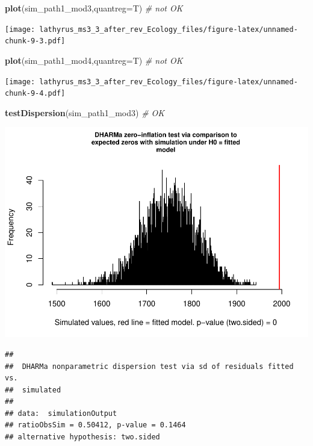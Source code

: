 \documentclass[
]{article}
\newenvironment{Shaded}{\begin{snugshade}}{\end{snugshade}}
\newcommand{\CommentTok}[1]{\textcolor[rgb]{0.56,0.35,0.01}{\textit{#1}}}
\newcommand{\DataTypeTok}[1]{\textcolor[rgb]{0.13,0.29,0.53}{#1}}
\newcommand{\KeywordTok}[1]{\textcolor[rgb]{0.13,0.29,0.53}{\textbf{#1}}}
\newcommand{\NormalTok}[1]{#1}
\begin{document}
\begin{Shaded}
\begin{Highlighting}[]
\KeywordTok{plot}\NormalTok{(sim\_path1\_mod3,}\DataTypeTok{quantreg=}\NormalTok{T) }\CommentTok{\# not OK }
\end{Highlighting}
\end{Shaded}

\texttt{[image: lathyrus\_ms3\_3\_after\_rev\_Ecology\_files/figure-latex/unnamed-chunk-9-3.pdf]}

\begin{Shaded}
\begin{Highlighting}[]
\KeywordTok{plot}\NormalTok{(sim\_path1\_mod4,}\DataTypeTok{quantreg=}\NormalTok{T) }\CommentTok{\# not OK}
\end{Highlighting}
\end{Shaded}

\texttt{[image: lathyrus\_ms3\_3\_after\_rev\_Ecology\_files/figure-latex/unnamed-chunk-9-4.pdf]}

\begin{Shaded}
\begin{Highlighting}[]
\KeywordTok{testDispersion}\NormalTok{(sim\_path1\_mod3) }\CommentTok{\# OK}
\end{Highlighting}
\end{Shaded}

\includegraphics{lathyrus_ms3_3_after_rev_Ecology_files/figure-latex/unnamed-chunk-10-1.pdf}

\begin{verbatim}
## 
##  DHARMa nonparametric dispersion test via sd of residuals fitted vs.
##  simulated
## 
## data:  simulationOutput
## ratioObsSim = 0.50412, p-value = 0.1464
## alternative hypothesis: two.sided
\end{verbatim}
\end{document}
